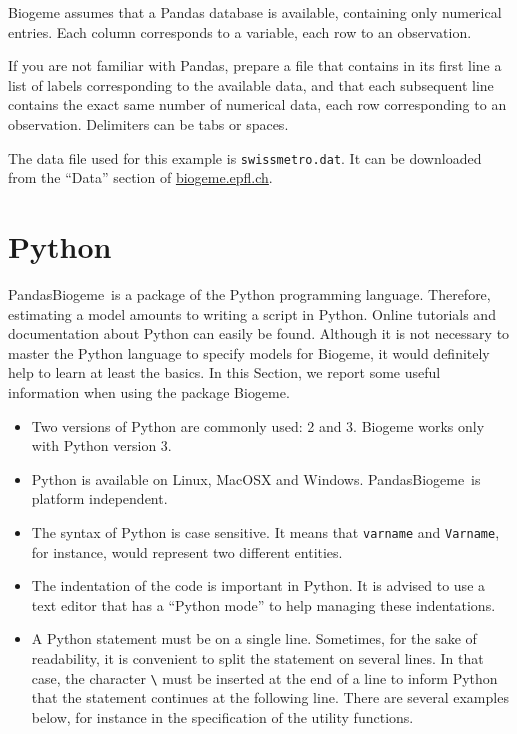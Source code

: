 \documentclass[12pt,a4paper]{article}
\newcommand{\PDBIOGEME}{PandasBiogeme}
\begin{document}
Biogeme assumes that a Pandas database is available, containing only numerical
entries. Each column corresponds to a variable, each row to an
observation.

If you are not familiar with Pandas, prepare a file that contains in its first line a list
of labels corresponding to the available data, and that each
subsequent line contains the exact same number of numerical data, each
row corresponding to an observation. Delimiters can be tabs or
spaces. 


The data file used for this example is \texttt{swissmetro.dat}. It can
be downloaded from the ``Data'' section of \href{http://biogeme.epfl.ch}{biogeme.epfl.ch}.



\section{Python}

\PDBIOGEME\ is a package of the Python programming
language. Therefore, estimating a model amounts to writing a script in
 Python. Online tutorials and  documentation about Python can easily be found. Although it
is not necessary to master the Python language to specify models for
Biogeme, it would definitely help to learn at least the basics. In
this Section, we report some useful information when using the package
Biogeme.
\begin{itemize}
\item Two versions of Python are commonly used: 2 and 3. Biogeme works only
  with Python version 3.
 \item Python is available on Linux, MacOSX and
   Windows. \PDBIOGEME\ is platform independent. 
\item The syntax of Python is case sensitive. It means that
\verb+varname+ and \verb+Varname+, for instance, would represent two
different entities.
\item The indentation of the code is important in Python. It is
  advised to use a text editor that has a ``Python mode'' to help
  managing these indentations.
 \item A Python statement must be on a single line. Sometimes, for the
   sake of readability, it is convenient to split the statement on
   several lines. In that case, the character \lstinline+\+ must be
   inserted at the end of a line to inform Python that the statement
   continues at the following line. There are several examples below,
   for instance in the specification of the utility functions.
\end{itemize}
\end{document}
